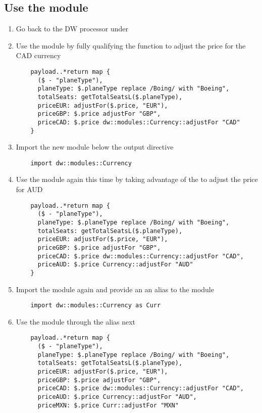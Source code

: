 \subsection{Use the module}
\begin{enumerate}[resume*]
\item Go back to the DW processor under 
\item Use the module by fully qualifying the function to adjust the price for the CAD currency
  \begin{lstlisting}
    payload..*return map {
      ($ - "planeType"),
      planeType: $.planeType replace /Boing/ with "Boeing",
      totalSeats: getTotalSeatsL($.planeType),
      priceEUR: adjustFor($.price, "EUR"),
      priceGBP: $.price adjustFor "GBP",
      priceCAD: $.price dw::modules::Currency::adjustFor "CAD"
    }    
  \end{lstlisting}
\item Import the new module below the output directive
  \begin{lstlisting}
    import dw::modules::Currency
  \end{lstlisting}
\item Use the module again this time by taking advantage of the  to adjust the price for AUD
  \begin{lstlisting}
    payload..*return map {
      ($ - "planeType"),
      planeType: $.planeType replace /Boing/ with "Boeing",
      totalSeats: getTotalSeatsL($.planeType),
      priceEUR: adjustFor($.price, "EUR"),
      priceGBP: $.price adjustFor "GBP",
      priceCAD: $.price dw::modules::Currency::adjustFor "CAD",
      priceAUD: $.price Currency::adjustFor "AUD"
    }      
  \end{lstlisting}
\item Import the module again and provide an an alias to the module
  \begin{lstlisting}
    import dw::modules::Currency as Curr
  \end{lstlisting}
\item Use the module through the  alias next
  \begin{lstlisting}
    payload..*return map {
      ($ - "planeType"),
      planeType: $.planeType replace /Boing/ with "Boeing",
      totalSeats: getTotalSeatsL($.planeType),
      priceEUR: adjustFor($.price, "EUR"),
      priceGBP: $.price adjustFor "GBP",
      priceCAD: $.price dw::modules::Currency::adjustFor "CAD",
      priceAUD: $.price Currency::adjustFor "AUD",
      priceMXN: $.price Curr::adjustFor "MXN"

\end{lstlisting}
\end{enumerate}
